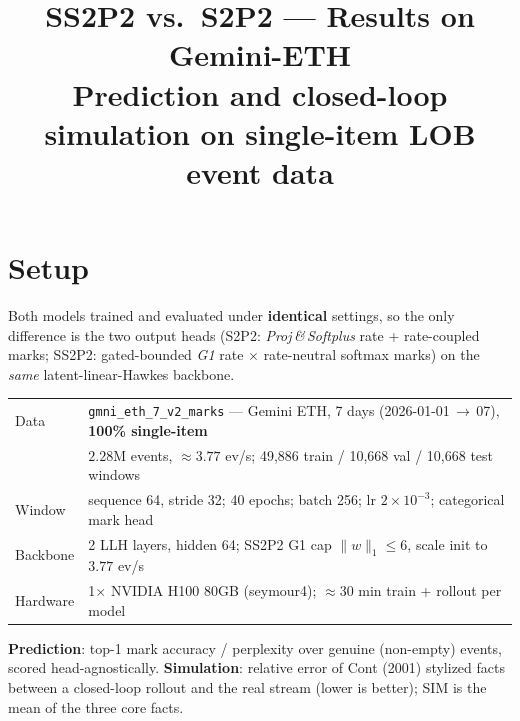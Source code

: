 \documentclass[11pt]{article}
\title{\textbf{SS2P2 vs.\ S2P2 — Results on Gemini-ETH}\\[2pt]
\large Prediction and closed-loop simulation on single-item LOB event data}
\author{}\date{}
\begin{document}
\maketitle\vspace{-2.6em}

\section{Setup}
Both models trained and evaluated under \textbf{identical} settings, so the only difference is the
two output heads (S2P2: \emph{Proj\,\&\,Softplus} rate + rate-coupled marks; SS2P2: gated-bounded
\emph{G1} rate $\times$ rate-neutral softmax marks) on the \emph{same} latent-linear-Hawkes backbone.
\begin{center}\small\renewcommand{\arraystretch}{1.12}
\begin{tabular}{ll}
\toprule
Data & \texttt{gmni\_eth\_7\_v2\_marks} — Gemini ETH, 7 days (2026-01-01\,$\to$\,07), \textbf{100\% single-item}\\
 & $2.28$M events, $\approx 3.77$ ev/s; 49{,}886 train / 10{,}668 val / 10{,}668 test windows\\
Window & sequence 64, stride 32; 40 epochs; batch 256; lr $2\times10^{-3}$; categorical mark head\\
Backbone & 2 LLH layers, hidden 64; SS2P2 G1 cap $\|w\|_1\le6$, scale init to $3.77$ ev/s\\
Hardware & 1$\times$ NVIDIA H100 80GB (seymour4); $\approx$30 min train + rollout per model\\
\bottomrule
\end{tabular}
\end{center}

\noindent\textbf{Prediction}: top-1 mark accuracy / perplexity over genuine (non-empty) events,
scored head-agnostically. \textbf{Simulation}: relative error of Cont (2001) stylized facts between a
closed-loop rollout and the real stream (lower is better); SIM is the mean of the three core facts.
\end{document}
